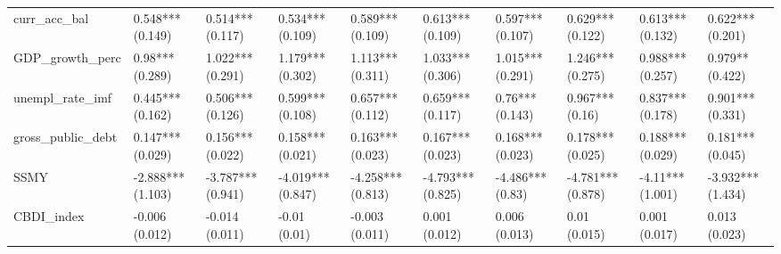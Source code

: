 \begin{table}[ht]
\begin{tabular}{llllllllll}
  curr\_acc\_bal & 0.548*** (0.149) & 0.514*** (0.117) & 0.534*** (0.109) & 0.589*** (0.109) & 0.613*** (0.109) & 0.597*** (0.107) & 0.629*** (0.122) & 0.613*** (0.132) & 0.622*** (0.201) \\ 
  GDP\_growth\_perc & 0.98*** (0.289) & 1.022*** (0.291) & 1.179*** (0.302) & 1.113*** (0.311) & 1.033*** (0.306) & 1.015*** (0.291) & 1.246*** (0.275) & 0.988*** (0.257) & 0.979** (0.422) \\ 
  unempl\_rate\_imf & 0.445*** (0.162) & 0.506*** (0.126) & 0.599*** (0.108) & 0.657*** (0.112) & 0.659*** (0.117) & 0.76*** (0.143) & 0.967*** (0.16) & 0.837*** (0.178) & 0.901*** (0.331) \\ 
  gross\_public\_debt & 0.147*** (0.029) & 0.156*** (0.022) & 0.158*** (0.021) & 0.163*** (0.023) & 0.167*** (0.023) & 0.168*** (0.023) & 0.178*** (0.025) & 0.188*** (0.029) & 0.181*** (0.045) \\ 
  SSMY & -2.888*** (1.103) & -3.787*** (0.941) & -4.019*** (0.847) & -4.258*** (0.813) & -4.793*** (0.825) & -4.486*** (0.83) & -4.781*** (0.878) & -4.11*** (1.001) & -3.932*** (1.434) \\ 
  CBDI\_index & -0.006 (0.012) & -0.014 (0.011) & -0.01 (0.01) & -0.003 (0.011) & 0.001 (0.012) & 0.006 (0.013) & 0.01 (0.015) & 0.001 (0.017) & 0.013 (0.023) \\ 
   \bottomrule
\end{tabular}
\endgroup
\end{table}
